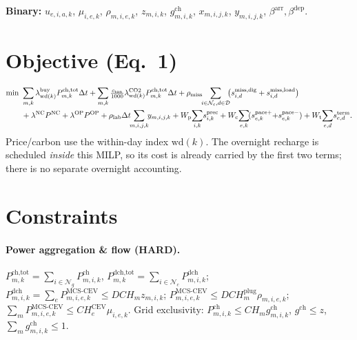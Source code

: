 \documentclass[11pt]{article}
\newcommand{\dt}{\Delta t}
\begin{document}
\smallskip
\textbf{Binary:} $u_{e,i,a,k}$, $\mu_{i,e,k}$, $\rho_{m,i,e,k}$, $z_{m,i,k}$,
$g^{\text{ch}}_{m,i,k}$, $x_{m,i,j,k}$, $y_{m,i,j,k}$, $\beta^{\text{arr}},\beta^{\text{dep}}$.

\section{Objective (Eq.\ 1)}
\begin{align}
\min\ &\sum_{m,k}\lambda^{\text{buy}}_{\mathrm{wd}(k)}P^{\text{ch,tot}}_{m,k}\dt
      +\sum_{m,k}\tfrac{c_{\text{ton}}}{1000}\lambda^{\text{CO2}}_{\mathrm{wd}(k)}P^{\text{ch,tot}}_{m,k}\dt
      +\rho_{\text{miss}}\!\!\sum_{i\in\mathcal{N}_c,d\in\mathcal{D}}\!\!\bigl(s^{\text{miss,dig}}_{i,d}+s^{\text{miss,load}}_{i,d}\bigr)\notag\\
     &+\lambda^{\text{NC}}P^{\text{NC}}+\lambda^{\text{OP}}P^{\text{OP}}
      +\rho_{\text{lab}}\dt\!\!\sum_{m,i,j,k}\!\! y_{m,i,j,k}
      + W_{\text{p}}\!\sum_{i,k}\! s^{\text{prec}}_{i,k}
      + W_{\text{c}}\!\sum_{e,k}\!(s^{\text{pace}+}_{e,k}{+}s^{\text{pace}-}_{e,k})
      + W_{\text{t}}\!\sum_{e,d}\! s^{\text{term}}_{e,d}.
\end{align}
Price/carbon use the within-day index $\mathrm{wd}(k)$. The overnight recharge is scheduled
\emph{inside} this MILP, so its cost is already carried by the first two terms; there is no
separate overnight accounting.

\section{Constraints}

\paragraph{Power aggregation \& flow (HARD).}
$P^{\text{ch,tot}}_{m,k}=\sum_{i\in\mathcal{N}_g}P^{\text{ch}}_{m,i,k}$,
$P^{\text{dch,tot}}_{m,k}=\sum_{i\in\mathcal{N}_c}P^{\text{dch}}_{m,i,k}$;
$P^{\text{dch}}_{m,i,k}=\sum_e P^{\text{MCS-CEV}}_{m,i,e,k}\le DCH_m z_{m,i,k}$;
$P^{\text{MCS-CEV}}_{m,i,e,k}\le DCH^{\text{plug}}_m\rho_{m,i,e,k}$;
$\sum_m P^{\text{MCS-CEV}}_{m,i,e,k}\le CH^{\text{CEV}}_e\mu_{i,e,k}$.
Grid exclusivity: $P^{\text{ch}}_{m,i,k}\le CH_m g^{\text{ch}}_{m,i,k}$,
$g^{\text{ch}}\le z$, $\sum_m g^{\text{ch}}_{m,i,k}\le 1$.
\end{document}
